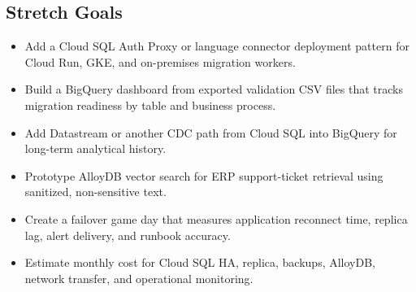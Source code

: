 \subsection*{Stretch Goals}
\begin{itemize}
    \item Add a Cloud SQL Auth Proxy or language connector deployment pattern for Cloud Run, GKE, and on-premises migration workers.
    \item Build a BigQuery dashboard from exported validation CSV files that tracks migration readiness by table and business process.
    \item Add Datastream or another CDC path from Cloud SQL into BigQuery for long-term analytical history.
    \item Prototype AlloyDB vector search for ERP support-ticket retrieval using sanitized, non-sensitive text.
    \item Create a failover game day that measures application reconnect time, replica lag, alert delivery, and runbook accuracy.
    \item Estimate monthly cost for Cloud SQL HA, replica, backups, AlloyDB, network transfer, and operational monitoring.
\end{itemize}

